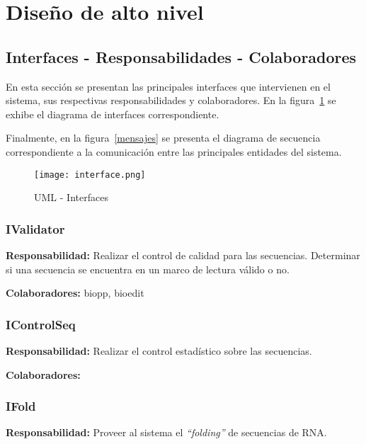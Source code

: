 \section{Diseño de alto nivel}
\label{high_level_design}

\subsection{Interfaces - Responsabilidades - Colaboradores}
En esta sección se presentan las principales interfaces que intervienen en el sistema, sus respectivas responsabilidades y colaboradores. En la figura~\ref{interface} se exhibe el diagrama de interfaces correspondiente.

Finalmente, en la figura~\ref{mensajes} se presenta el diagrama de secuencia correspondiente a la comunicación entre las principales entidades del sistema.

\begin{figure}[!hbtp]
	\begin{center}
		\texttt{[image: interface.png]}
		\caption{UML - Interfaces}
		\label{interface}
	\end{center}
\end{figure}

\subsubsection{IValidator}
\par \textbf{Responsabilidad:} Realizar el control de calidad para las secuencias. Determinar si una secuencia se encuentra en un marco de lectura válido o no. 

\par \textbf{Colaboradores:} biopp, bioedit
 
\subsubsection{IControlSeq}
\par \textbf{Responsabilidad:} Realizar el control estadístico sobre las secuencias.

\par \textbf{Colaboradores:}

\subsubsection{IFold}
\par \textbf{Responsabilidad:} Proveer al sistema el \emph{``folding''} de secuencias de RNA.

